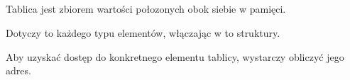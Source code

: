 
\subsection{\Conclusion{}}

Tablica jest zbiorem wartości połozonych obok siebie w pamięci.

Dotyczy to każdego typu elementów, włączając w to struktury.

Aby uzyskać dostęp do konkretnego elementu tablicy, wystarczy obliczyć jego adres.
